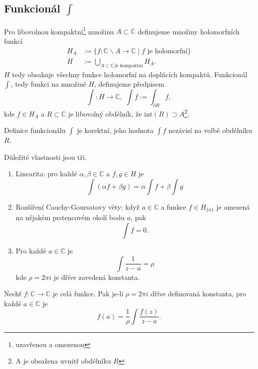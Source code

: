 \documentclass[../main.tex]{subfiles}
\begin{document}
\subsection{Funkcionál \texorpdfstring{$\int$}{Lg}}

\begin{definition}[Funkcionál]
    Pro libovolnou kompaktní\footnote{uzavřenou a omezenou} množinu $A\subset\mathbb{C}$
    definujeme množiny holomorfních funkcí 
    \begin{align*}
        H_A &:= \{ f: \mathbb{C}\backslash A \to \mathbb{C} \mid f \,\,\text{je holomorfní} \}\\
        H &:= \bigcup_{A\subset\mathbb{C}\,\text{je kompaktní}} H_A.
    \end{align*}
    $H$ tedy obsahuje všechny funkce holomorfní na doplňcích kompaktů.
    Funkcionál $\int$, tedy funkci na množině $H$, definujeme předpisem
    \[ \int : H \to \mathbb{C}, \,\, \int f := \int_{\partial R}f, \]
    kde $f\in H_A$ a $R\subset\mathbb{C}$ je libovolný obdélník, že $\text{int}(R) \supset A$\footnote{A je obsažena uvnitř obdélníku $R$}.
\end{definition}

\begin{lemma}
    Definice funkcionálu $\int$ je korektní, jeho hodnota $\int f$ nezávisí na volbě obdélníku $R$.
\end{lemma}

\begin{theorem}
    Důležité vlastnosti jsou tři.
    \begin{enumerate}
        \item Linearita: pro každé $\alpha,\beta \in \mathbb{C}$ a $f,g \in H$ je
        \[ \int(\alpha f + \beta g) = \alpha \int f + \beta \int g \]
        \item Rozšíření Cauchy-Goursatovy věty: když $a\in\mathbb{C}$ a funkce
        $f \in H_{\{a\}}$ je omezená na nějakém prstencovém okolí bodu $a$, pak
        \[ \int f = 0. \]
        \item Pro každé $a\in\mathbb{C}$ je
        \[ \int \frac{1}{z-a} = \rho \]
        kde $\rho = 2\pi i$ je dříve zavedená konstanta.
    \end{enumerate}
\end{theorem}


\begin{theorem}
    Nechť $f:\mathbb{C}\to\mathbb{C}$ je celá funkce. Pak je-li $\rho = 2\pi i$
    dříve definovaná konstanta, pro každé $a\in\mathbb{C}$ je
    \[ f(a) = \frac{1}{\rho}\int \frac{f(z)}{z-a}. \]
\end{theorem}
\end{document}
